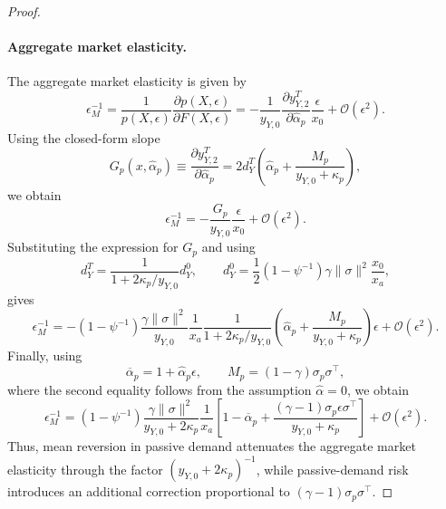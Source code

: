 \begin{proof}
\paragraph{Aggregate market elasticity.}
The aggregate market elasticity is given by
\begin{equation}
    \epsilon_{M}^{-1}
    = \frac{1}{p(X,\epsilon)}\frac{\partial p(X,\epsilon)}{\partial F(X,\epsilon)}
    = -\frac{1}{y_{Y,0}}
    \frac{\partial y_{Y,2}^{T}}{\partial \hat{\alpha}_p}
    \frac{\epsilon}{x_0}
    + \mathcal{O}(\epsilon^2).
\end{equation}
Using the closed-form slope
\begin{equation}
    G_p(x,\hat{\alpha}_p)
    \equiv
    \frac{\partial y_{Y,2}^{T}}{\partial \hat{\alpha}_p}
    =2d_Y^T\left(\hat{\alpha}_p+\frac{M_p}{y_{Y,0}+\kappa_p}\right),
\end{equation}
we obtain
\begin{equation}
    \epsilon_{M}^{-1}
    =-\frac{G_p}{y_{Y,0}}\frac{\epsilon}{x_0}
    +\mathcal{O}(\epsilon^2).
\end{equation}
Substituting the expression for $G_p$ and using
\begin{equation}
    d_Y^T
    =\frac{1}{1+2\kappa_p/y_{Y,0}}d_Y^0,
    \qquad
    d_Y^0
    =\frac{1}{2}(1-\psi^{-1})\gamma\|\sigma\|^2\frac{x_0}{x_a},
\end{equation}
gives
\begin{equation}
    \epsilon_{M}^{-1}
    =-
    \left(1-\psi^{-1}\right)
    \frac{\gamma\|\sigma\|^2}{y_{Y,0}}
    \frac{1}{x_a}
    \frac{1}{1+2\kappa_p/y_{Y,0}}
    \left(\hat{\alpha}_p+\frac{M_p}{y_{Y,0}+\kappa_p}\right)
    \epsilon
    +\mathcal{O}(\epsilon^2).
\end{equation}
Finally, using
\begin{equation}
    \overline{\alpha}_p=1+\hat{\alpha}_p\epsilon,
    \qquad
    M_p=(1-\gamma)\sigma_p\sigma^\top,
\end{equation}
where the second equality follows from the assumption $\hat{\alpha}=0$, we obtain
\begin{equation}\label{eq:elasticity-timevarying-noheterog-final}
    \epsilon_{M}^{-1}
    =
    \left(1-\psi^{-1}\right)
    \frac{\gamma\|\sigma\|^2}{y_{Y,0}+2\kappa_p}
    \frac{1}{x_a}
    \left[
        1-\overline{\alpha}_p
        +\frac{(\gamma-1)\sigma_p\epsilon\sigma^\top}{y_{Y,0}+\kappa_p}
    \right]
    +\mathcal{O}(\epsilon^2).
\end{equation}
Thus, mean reversion in passive demand attenuates the aggregate market elasticity through the factor $(y_{Y,0}+2\kappa_p)^{-1}$, while passive-demand risk introduces an additional correction proportional to $(\gamma-1)\sigma_p\sigma^\top$.


\end{proof}
